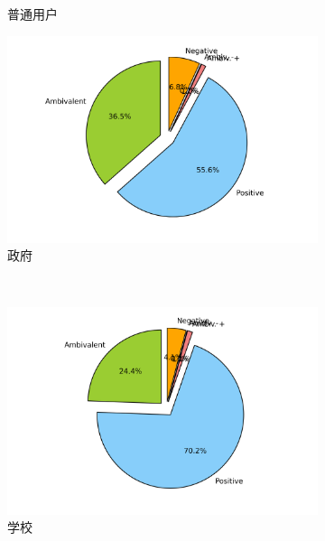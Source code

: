 \documentclass[12pt, oneside]{article}
\begin{document}
\begin{spacing}{1.5}
\begin{CJK}{UTF8}{gbsn}
\begin{figure}
\begin{subfigure}[b]{0.3\linewidth}
		\caption{普通用户}
	\end{subfigure}
	\begin{subfigure}[b]{0.3\linewidth}
		\centering
		\includegraphics[trim = 1.5cm 0 1.5cm 0, clip = true, width=\textwidth]{../result/charts/emotion_identification_government}
		\caption{政府}
	\end{subfigure}
	\\
	\begin{subfigure}[b]{0.3\linewidth}
		\centering
		\includegraphics[trim = 1.5cm 0 1.5cm 0, clip = true, width=\textwidth]{../result/charts/emotion_identification_campus}
		\caption{学校}
	\end{subfigure}
	\begin{subfigure}[b]{0.3\linewidth}
		\centering

\end{subfigure}
\end{figure}
\end{CJK}
\end{spacing}
\end{document}
